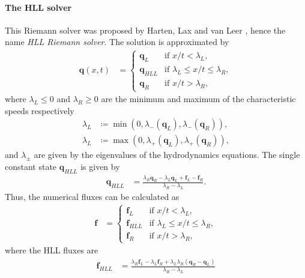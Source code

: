\paragraph{The HLL solver}
This Riemann solver was proposed by Harten, Lax and van Leer \cite{harten1983upstream}, hence the name \textit{HLL Riemann solver}.
The solution is approximated by
\begin{align}
    \mathbf{q}(x,t) &= 
    \begin{cases}
        \mathbf{q}_L & \text{if } x/t < \lambda_L, \\
        \mathbf{q}_{HLL} & \text{if } \lambda_L \leq x/t \leq \lambda_R, \\
        \mathbf{q}_R & \text{if } x/t > \lambda_R,
    \end{cases}
\end{align}
where $\lambda_L \leq 0$ and $\lambda_R \geq 0$ are the minimum and maximum of the characteristic speeds respectively
\begin{align}
    \lambda_L &\coloneqq \min\left(0, \lambda_- \left(\mathbf{q}_L\right), \lambda_- \left(\mathbf{q}_R\right) \right), \\
    \lambda_L &\coloneqq \max\left(0, \lambda_+ \left(\mathbf{q}_L\right), \lambda_+ \left(\mathbf{q}_R\right) \right),
\end{align}
and $\lambda_{\pm}$ are given by the eigenvalues of the hydrodynamics equations.
The single constant state $\mathbf{q}_{HLL}$ is given by
\begin{align}
    \mathbf{q}_{HLL} &= \frac{\lambda_R \mathbf{q}_R - \lambda_L \mathbf{q}_L + \mathbf{f}_L - \mathbf{f}_R}{\lambda_R-\lambda_L}.
\end{align}
Thus, the numerical fluxes can be calculated as
\begin{align}
    \mathbf{f} &=
    \begin{cases}
        \mathbf{f}_L & \text{if } x/t < \lambda_L, \\
        \mathbf{f}_{HLL} & \text{if } \lambda_L \leq x/t \leq \lambda_R, \\
        \mathbf{f}_R & \text{if } x/t > \lambda_R,
    \end{cases}
\end{align}
where the HLL fluxes are
\begin{align}\label{eq:HLL_flux}
    \mathbf{f}_{HLL} &=
    \frac{\lambda_R \mathbf{f}_L - \lambda_L \mathbf{f}_R + \lambda_L \lambda_R \left(\mathbf{q}_R - \mathbf{q}_L\right)}{\lambda_R-\lambda_L}
\end{align}

